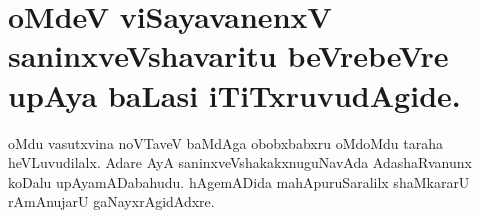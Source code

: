 \section*{oMdeV viSayavanenxV saninxveVshavaritu beVrebeVre upAya baLasi iTiTxruvudAgide.}

oMdu vasutxvina noVTaveV baMdAga obobxbabxru oMdoMdu taraha heVLuvudilalx. Adare AyA saninxveVshakakxnuguNavAda AdashaRvanunx koDalu upAyamADabahudu. hAgemADida mahApuruSaralilx shaMkararU rAmAnujarU gaNayxrAgidAdxre.



